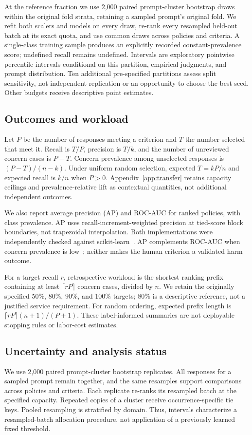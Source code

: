\documentclass[manuscript,screen,review,anonymous]{acmart}
\begin{document}
At the reference fraction we use 2,000 paired prompt-cluster bootstrap draws within the original fold strata, retaining a sampled prompt's original fold. We refit both scalers and models on every draw, re-rank every resampled held-out batch at its exact quota, and use common draws across policies and criteria. A single-class training sample produces an explicitly recorded constant-prevalence score; undefined recall remains undefined. Intervals are exploratory pointwise percentile intervals conditional on this partition, empirical judgments, and prompt distribution. Ten additional pre-specified partitions assess split sensitivity, not independent replication or an opportunity to choose the best seed. Other budgets receive descriptive point estimates.

\subsection{Outcomes and workload}
Let $P$ be the number of responses meeting a criterion and $T$ the number selected that meet it. Recall is $T/P$, precision is $T/k$, and the number of unreviewed concern cases is $P-T$. Concern prevalence among unselected responses is $(P-T)/(n-k)$. Under uniform random selection, expected $T=kP/n$ and expected recall is $k/n$ when $P>0$. Appendix~\ref{app:transfer} retains capacity ceilings and prevalence-relative lift as contextual quantities, not additional independent outcomes.

We also report average precision (AP) and ROC-AUC for ranked policies, with class prevalence. AP uses recall-increment-weighted precision at tied-score block boundaries, not trapezoidal interpolation. Both implementations were independently checked against scikit-learn~\cite{pedregosa2011scikit}. AP complements ROC-AUC when concern prevalence is low~\cite{saito2015precision}; neither makes the human criterion a validated harm outcome.

For a target recall $r$, retrospective workload is the shortest ranking prefix containing at least $\lceil rP\rceil$ concern cases, divided by $n$. We retain the originally specified 50\%, 80\%, 90\%, and 100\% targets; 80\% is a descriptive reference, not a justified service requirement. For random ordering, expected prefix length is $\lceil rP\rceil(n+1)/(P+1)$. These label-informed summaries are not deployable stopping rules or labor-cost estimates.

\subsection{Uncertainty and analysis status}
We use 2,000 paired prompt-cluster bootstrap replicates. All responses for a sampled prompt remain together, and the same resamples support comparisons across policies and criteria. Each replicate re-ranks its resampled batch at the specified capacity. Repeated copies of a cluster receive occurrence-specific tie keys. Pooled resampling is stratified by domain. Thus, intervals characterize a resampled-batch allocation procedure, not application of a previously learned fixed threshold.
\end{document}
